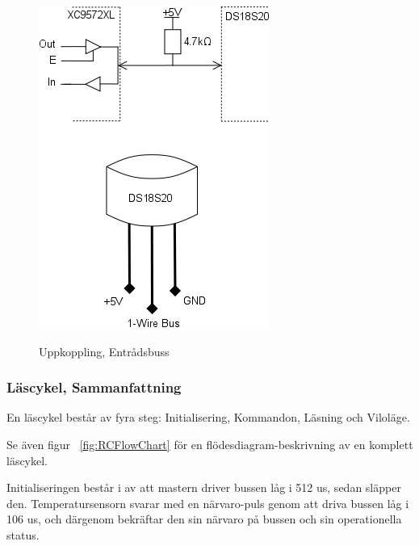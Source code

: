 \documentclass[a4paper,11pt]{article}
\begin{document}
		\begin{figure}[ht!tb]
		  \centering
		      \includegraphics[scale=1, angle=0]{TempBus.png}
			\label{fig:TempBus}
		  	\caption{Uppkoppling, Entrådsbuss}
		\end{figure}

	\subsubsection{Läscykel, Sammanfattning}

	En läscykel består av fyra steg: Initialisering, Kommandon, Läsning och Viloläge.

	Se även figur ~\ref{fig:RCFlowChart} för en flödesdiagram-beskrivning av en komplett läscykel.

	Initialiseringen består i av att mastern driver bussen låg i 512 us, sedan släpper den.
	Temperatursensorn svarar med en närvaro-puls genom att driva bussen låg i 106 us, och därgenom bekräftar den sin 	 närvaro på bussen och sin operationella status.
\end{document}

